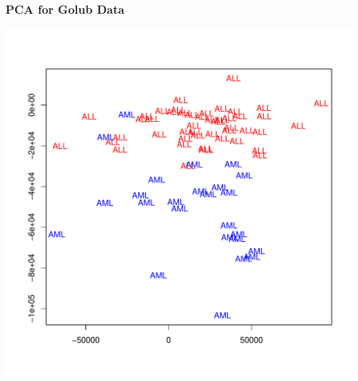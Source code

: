 \documentclass[xcolor=x11names,compress]{beamer}\usepackage[]{graphicx}\usepackage[]{color}
\newenvironment{knitrout}{}{} %
\begin{document}
\begin{frame}[containsverbatim]
  \frametitle{PCA for Golub Data}
\begin{knitrout}\tiny
{}\color{fgcolor}

{\centering \includegraphics[width=.6\linewidth]{figure/beamer-pcagolub-1} 

}



\end{knitrout}
\end{frame}
\end{document}

